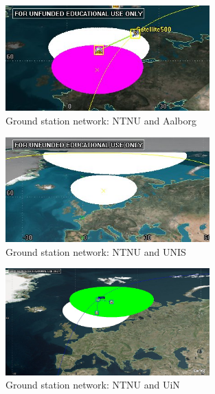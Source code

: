 \begin{figure}
  \begin{center}
    \includegraphics[width=0.7\textwidth]{Figures/range_ntnu_aalborg}
  \end{center}
  \caption{Ground station network: NTNU and Aalborg}
  \label{fig:range_ntnu_aalborg}
\end{figure}

\begin{figure}
  \begin{center}
    \includegraphics[width=0.7\textwidth]{Figures/range_ntnu_svalbard}
  \end{center}
  \caption{Ground station network: NTNU and UNIS}
  \label{fig:range_ntnu_unis}
\end{figure}

\begin{figure}
  \begin{center}
    \includegraphics[width=0.7\textwidth]{Figures/range_ntnu_narvik}
  \end{center}
  \caption{Ground station network: NTNU and UiN}
  \label{fig:range_ntnu_unis}
\end{figure}


